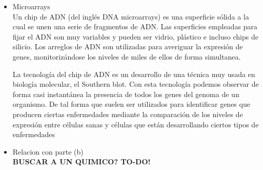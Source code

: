 \begin{enumerate}
\begin{itemize}
\item Microarrays \\

Un chip de ADN (del inglés DNA microarrays) es una superficie sólida a la cual 
se unen una serie de fragmentos de ADN. Las superficies empleadas para fijar el 
ADN son muy variables y pueden ser vidrio, plástico e incluso chips de silicio. 
Los arreglos de ADN son utilizadas para averiguar la expresión de genes, 
monitorizándose los niveles de miles de ellos de forma simultanea.

La tecnología del chip de ADN es un desarrollo de una técnica muy usada en biología 
molecular, el Southern blot. Con esta tecnología podemos observar de forma casi
 instantánea la presencia de todos los genes del genoma de un organismo. De tal
 forma que suelen ser utilizados para identificar genes que producen ciertas 
enfermedades mediante la comparación de los niveles de expresión entre células
 sanas y células que están desarrollando ciertos tipos de enfermedades

\item Relacion con parte (b) \\

\LARGE \textbf{BUSCAR A UN QUIMICO? TO-DO!}

\end{itemize}


\end{enumerate}
